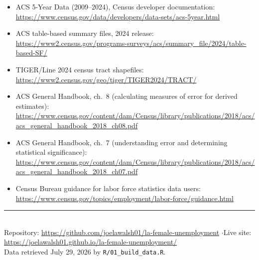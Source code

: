 \documentclass[11pt]{article}
\begin{document}
\begin{itemize}
\item ACS 5-Year Data (2009--2024), Census developer documentation:\\
  \small\url{https://www.census.gov/data/developers/data-sets/acs-5year.html}
\item ACS table-based summary files, 2024 release:\\
  \small\url{https://www2.census.gov/programs-surveys/acs/summary_file/2024/table-based-SF/}
\item TIGER/Line 2024 census tract shapefiles:\\
  \small\url{https://www2.census.gov/geo/tiger/TIGER2024/TRACT/}
\item ACS General Handbook, ch.~8 (calculating measures of error for derived estimates):\\
  \small\url{https://www.census.gov/content/dam/Census/library/publications/2018/acs/acs_general_handbook_2018_ch08.pdf}
\item ACS General Handbook, ch.~7 (understanding error and determining statistical significance):\\
  \small\url{https://www.census.gov/content/dam/Census/library/publications/2018/acs/acs_general_handbook_2018_ch07.pdf}
\item Census Bureau guidance for labor force statistics data users:\\
  \small\url{https://www.census.gov/topics/employment/labor-force/guidance.html}
\end{itemize}

\vfill
\noindent\rule{\linewidth}{0.4pt}\\
\small Repository: \url{https://github.com/joelawalsh01/la-female-unemployment}
\quad$\cdot$\quad Live site: \url{https://joelawalsh01.github.io/la-female-unemployment/}\\
Data retrieved July 29, 2026 by \texttt{R/01\_build\_data.R}.
\end{document}
